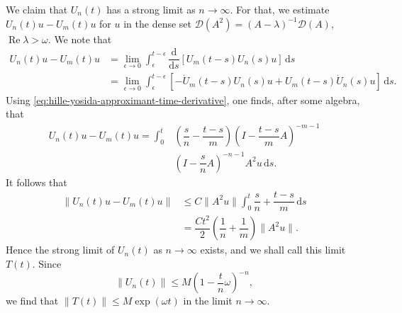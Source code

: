 We claim that $U_n(t)$ has a strong limit as $n\to\infty$. For that, we estimate $U_n(t)u-U_m(t)u$ for $u$ in the dense set $\mathcal{D}(A^2)=(A-\lambda)^{-1}\mathcal{D}(A)$, $\operatorname{Re}\lambda>\omega$. We note that\[\begin{aligned}
U_n(t)u-U_m(t)u&=\lim_{\epsilon\to0}\int_\epsilon^{t-\epsilon}\dfrac{\mathrm{d}}{\mathrm{d}s}[U_m(t-s)U_n(s)u]\,\mathrm{d}s\\
&=\lim_{\epsilon\to0}\int_\epsilon^{t-\epsilon}[-\dot U_m(t-s)U_n(s)u+U_m(t-s)\dot U_n(s)u]\,\mathrm{d}s.
\end{aligned}\]Using \eqref{eq:hille-yosida-approximant-time-derivative}, one finds, after some algebra, that
\begin{equation}\label{eq:hille-yosida-two-approximants-difference-integral}
\begin{aligned}U_n(t)u-U_m(t)u=\int_0^t&\left(\dfrac{s}{n}-\dfrac{t-s}{m}\right)\left(I-\dfrac{t-s}{m}A\right)^{-m-1}\\&\left(I-\dfrac{s}{n}A\right)^{-n-1}A^2u\,\mathrm{d}s.\end{aligned}
\end{equation}
It follows that
\begin{equation}\label{eq:hille-yosida-approximants-cauchy-bound}
\begin{aligned}\|U_n(t)u-U_m(t)u\|&\leq C\|A^2u\|\int_0^t\dfrac{s}{n}+\dfrac{t-s}{m}\,\mathrm{d}s\\&=\dfrac{Ct^2}{2}\left(\dfrac{1}{n}+\dfrac{1}{m}\right)\|A^2u\|.\end{aligned}
\end{equation}
Hence the strong limit of $U_n(t)$ as $n\to\infty$ exists, and we shall call this limit $T(t)$. Since
\begin{equation}\label{eq:hille-yosida-approximant-exponential-growth-bound}
\|U_n(t)\|\leq M\left(1-\dfrac{t}{n}\omega\right)^{-n},
\end{equation}
we find that $\|T(t)\|\leq M\exp(\omega t)$ in the limit $n\to\infty$.

